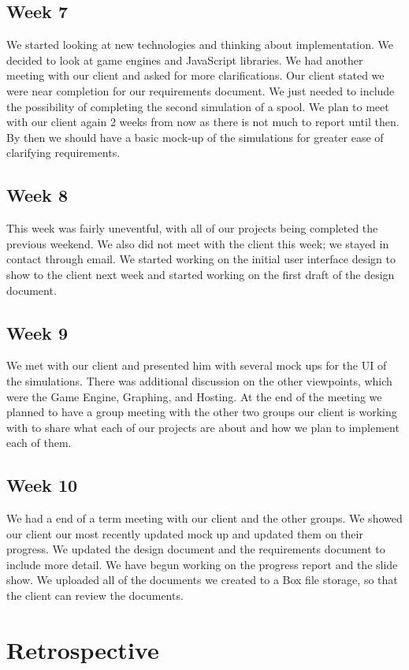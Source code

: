 \documentclass[onecolumn, draftclsnofoot,10pt, compsoc]{IEEEtran}
\begin{document}
\subsection{Week 7}
We started looking at new technologies and thinking about implementation. We decided to look at game engines and  JavaScript libraries.
We had another meeting with our client and asked for more clarifications. Our client stated we were near completion for our requirements document. We just needed to include the possibility of completing the second simulation of a spool.
We plan to meet with our client again 2 weeks from now as there is not much to report until then. By then we should have a basic mock-up of the simulations for greater ease of clarifying requirements. 

\subsection{Week 8}
This week was fairly uneventful, with all of our projects being completed the previous weekend. We also did not meet with the client this week; we stayed in contact through email.
We started working on the initial user interface design to show to the client next week and started working on the first draft of the design document. 

\subsection{Week 9}
We met with our client and presented him with several mock ups for the UI of the simulations. There was additional discussion on the other viewpoints, which were the Game Engine, Graphing, and Hosting. At the end of the meeting we planned to have a group meeting with the other two groups our client is working with to share what each of our projects are about and how we plan to implement each of them. 


\subsection{Week 10}
We had a end of a term meeting with our client and the other groups. We showed our client our most recently updated mock up and updated them on their progress. We updated the design document and the requirements document to include more detail. We have begun working on the progress report and the slide show. We uploaded all of the documents we created to a Box file storage, so that the client can review the documents.



\section{Retrospective}

\end{document}
